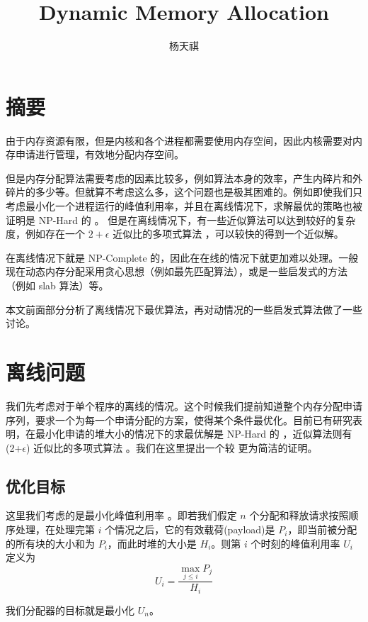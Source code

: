 \documentclass{noiassignment}
\title{Dynamic Memory Allocation}
\author{杨天祺}
\begin{document}
	\maketitle

	\tableofcontents

	\newpage

	\section{摘要}
	由于内存资源有限，但是内核和各个进程都需要使用内存空间，因此内核需要对内存申请进行管理，有效地分配内存空间。

	但是内存分配算法需要考虑的因素比较多，例如算法本身的效率，产生内碎片和外碎片的多少等。但就算不考虑这么多，这个问题也是极其困难的。例如即使我们只考虑最小化一个进程运行的峰值利用率，并且在离线情况下，求解最优的策略也被证明是 NP-Hard 的 \cite{opt-nph}。
	但是在离线情况下，有一些近似算法可以达到较好的复杂度，例如存在一个 $2 + \epsilon$ 近似比的多项式算法 \cite{M2015A}，可以较快的得到一个近似解。

	在离线情况下就是 NP-Complete 的，因此在在线的情况下就更加难以处理。一般现在动态内存分配采用贪心思想（例如最先匹配算法），或是一些启发式的方法（例如 slab 算法\cite{bonwick1994slab}）等。

	本文前面部分分析了离线情况下最优算法，再对动情况的一些启发式算法做了一些讨论。

	\section{离线问题}
	我们先考虑对于单个程序的离线的情况。这个时候我们提前知道整个内存分配申请序列，要求一个为每一个申请分配的方案，使得某个条件最优化。目前已有研究表明，在最小化申请的堆大小的情况下的求最优解是 NP-Hard 的 \cite{opt-nph}，近似算法则有 (2+$\epsilon$) 近似比的多项式算法 \cite{M2015A}。我们在这里提出一个较 \cite{opt-nph} 更为简洁的证明。

	\subsection{优化目标}

	这里我们考虑的是最小化峰值利用率 \cite{Bryant:2015:CSP:2846227}。即若我们假定 $n$ 个分配和释放请求按照顺序处理，在处理完第 $i$ 个情况之后，它的有效载荷(payload)是 $P_i$，即当前被分配的所有块的大小和为 $P_i$，而此时堆的大小是 $H_i$。则第 $i$ 个时刻的峰值利用率 $U_i$ 定义为
	$$
	U_i = \frac{\max_{j \le i} P_j}{H_i}
	$$

	我们分配器的目标就是最小化 $U_n$。
	
\end{document}
